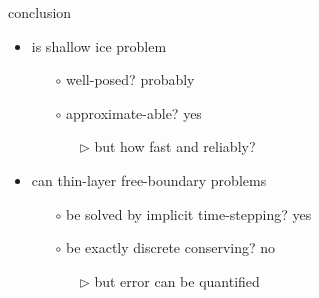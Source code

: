 \documentclass[hide notes,intlimits]{beamer}
\begin{document}
\begin{frame}{conclusion}
\begin{itemize}
\item is shallow ice problem
  \begin{itemize}
  \item[$\circ$] well-posed? \qquad \alert{probably}
  \item[$\circ$] approximate-able? \qquad \alert{yes}
     \begin{itemize}
     \item[$\triangleright$] but how fast and reliably?
     \end{itemize}
  \end{itemize}
\item can thin-layer free-boundary problems
  \begin{itemize}
  \item[$\circ$] be solved by implicit time-stepping? \qquad \alert{yes}
  \item[$\circ$] be exactly discrete conserving? \qquad \alert{no}
     \begin{itemize}
     \item[$\triangleright$] but error can be quantified
     \end{itemize}
  \end{itemize}


\end{itemize}
\end{frame}
\end{document}
